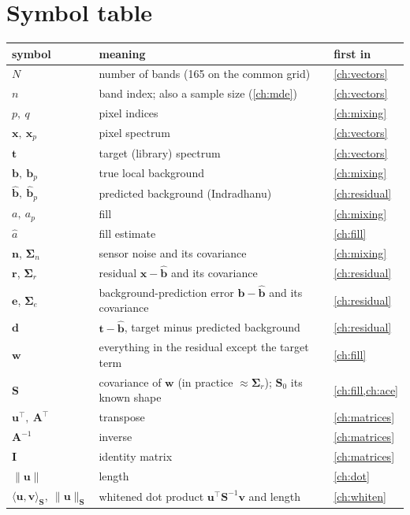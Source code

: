 \documentclass[11pt,a4paper,oneside,openany]{book}
\newcommand{\B}[1]{{\symbf{#1}}}
\newcommand{\B}[1]{{\bm{#1}}}
\newcommand{\T}{^{\top}}
\newcommand{\nrm}[1]{\lVert #1\rVert}
\newcommand{\vx}{\B{x}}
\newcommand{\vt}{\B{t}}
\newcommand{\vb}{\B{b}}
\newcommand{\vbh}{\hat{\B{b}}}
\newcommand{\vr}{\B{r}}
\newcommand{\ve}{\B{e}}
\newcommand{\vn}{\B{n}}
\newcommand{\vd}{\B{d}}
\newcommand{\vu}{\B{u}}
\newcommand{\vv}{\B{v}}
\newcommand{\vw}{\B{w}}
\newcommand{\mS}{\B{S}}
\newcommand{\mI}{\B{I}}
\newcommand{\mA}{\B{A}}
\newcommand{\mSig}{\B{\Sigma}}
\newcommand{\ahat}{\hat a}
\begin{document}
\chapter{Symbol table}
\label{ch:symbols}

{\small
\begin{longtable}{@{}p{}p{}p{}@{}}
\toprule
symbol & meaning & first in\\
\midrule
\endhead
$N$ & number of bands (165 on the common grid) & \cref{ch:vectors}\\
$n$ & band index; also a sample size (\cref{ch:mde}) & \cref{ch:vectors}\\
$p,\ q$ & pixel indices & \cref{ch:mixing}\\
$\vx,\ \vx_p$ & pixel spectrum & \cref{ch:vectors}\\
$\vt$ & target (library) spectrum & \cref{ch:vectors}\\
$\vb,\ \vb_p$ & true local background & \cref{ch:mixing}\\
$\vbh,\ \vbh_p$ & predicted background (Indradhanu) & \cref{ch:residual}\\
$a,\ a_p$ & fill & \cref{ch:mixing}\\
$\ahat$ & fill estimate & \cref{ch:fill}\\
$\vn$, $\mSig_n$ & sensor noise and its covariance & \cref{ch:mixing}\\
$\vr$, $\mSig_r$ & residual $\vx-\vbh$ and its covariance & \cref{ch:residual}\\
$\ve$, $\mSig_e$ & background-prediction error $\vb-\vbh$ and its covariance & \cref{ch:residual}\\
$\vd$ & $\vt-\vbh$, target minus predicted background & \cref{ch:residual}\\
$\vw$ & everything in the residual except the target term & \cref{ch:fill}\\
$\mS$ & covariance of $\vw$ (in practice $\approx\mSig_r$); $\mS_0$ its known shape & \cref{ch:fill,ch:ace}\\
$\vu\T,\ \mA\T$ & transpose & \cref{ch:matrices}\\
$\mA^{-1}$ & inverse & \cref{ch:matrices}\\
$\mI$ & identity matrix & \cref{ch:matrices}\\
$\nrm{\vu}$ & length & \cref{ch:dot}\\
$\langle\vu,\vv\rangle_{\mS},\ \nrm{\vu}_{\mS}$ & whitened dot product $\vu\T\mS^{-1}\vv$ and length & \cref{ch:whiten}\\

\end{longtable}}
\end{document}

